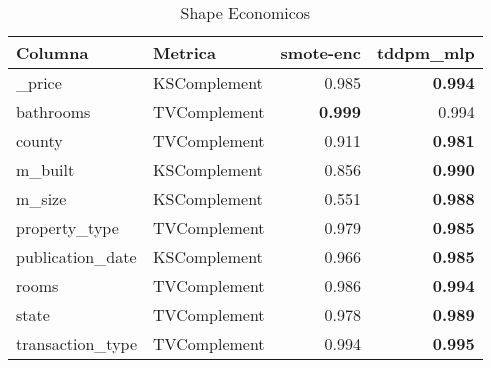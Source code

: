 \begin{table}[H]
\centering
\caption{Shape Economicos}
\label{table-shape-economicos-b-2}
\begin{tabular}{|l|l|r|r|}
\hline
\rowcolor[gray]{0.8}
Columna & Metrica & smote-enc & tddpm\_mlp \\
\hline \_price & KSComplement & 0.985 & \bfseries 0.994 \\
\hline bathrooms & TVComplement & \bfseries 0.999 & 0.994 \\
\hline county & TVComplement & 0.911 & \bfseries 0.981 \\
\hline m\_built & KSComplement & 0.856 & \bfseries 0.990 \\
\hline m\_size & KSComplement & 0.551 & \bfseries 0.988 \\
\hline property\_type & TVComplement & 0.979 & \bfseries 0.985 \\
\hline publication\_date & KSComplement & 0.966 & \bfseries 0.985 \\
\hline rooms & TVComplement & 0.986 & \bfseries 0.994 \\
\hline state & TVComplement & 0.978 & \bfseries 0.989 \\
\hline transaction\_type & TVComplement & 0.994 & \bfseries 0.995 \\
\hline
\end{tabular}
\end{table}
